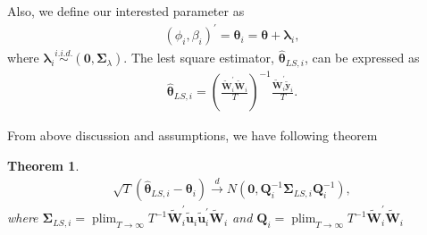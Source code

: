 \documentclass[12pt,a4paper,hyperref]{article}
\newtheorem{myTheo}{Theorem}
\DeclareMathOperator*{\plim}{plim}
\begin{document}
Also, we define our interested parameter as
\begin{align}
\left(\phi_{i},\beta_{i}  \right)^{'}=\boldsymbol{\theta}_{i}=\boldsymbol{\theta}+\boldsymbol{\lambda}_{i},
\end{align}
where $\boldsymbol{\lambda}_{i}\overset{i.i.d.}{\sim} \left(\boldsymbol{0}, \boldsymbol{\Sigma}_{\lambda} \right).$
The lest square estimator, $\hat{\boldsymbol{\theta}}_{LS,i}$, can be expressed as
\begin{align}
\hat{\boldsymbol{\theta}}_{LS,i}=\left(\frac{\tilde{\boldsymbol{W}}^{'}_{i} \tilde{\boldsymbol{W}}_{i}}{T}  \right)^{-1} \frac{ \tilde{\boldsymbol{W}}^{'}_{i}\tilde{\boldsymbol{y}}_{i}}{T}. \label{13}
\end{align}

From above discussion and assumptions, we have following theorem \\
\begin{myTheo}
\begin{align}
\sqrt{T}\left(\hat{\boldsymbol{\theta}}_{LS,i}-\boldsymbol{\theta}_{i}\right) \overset{d}{\to} N \left(\boldsymbol{0}, \boldsymbol{Q}_{i}^{-1}\boldsymbol{\Sigma}_{LS,i}\boldsymbol{Q}_{i}^{-1}  \right),
\end{align}
where $\boldsymbol{\Sigma}_{LS,i}=\plim_{T \to \infty} T^{-1}\tilde{\boldsymbol{W}}^{'}_{i} \tilde{\boldsymbol{u}}_{i} \tilde{\boldsymbol{u}}^{'}_{i}  \tilde{\boldsymbol{W}}_{i} $ and $\boldsymbol{Q}_{i}=\plim_{T \to \infty} T^{-1}\tilde{\boldsymbol{W}}^{'}_{i}\tilde{\boldsymbol{W}}_{i}$
\end{myTheo}
\end{document}

